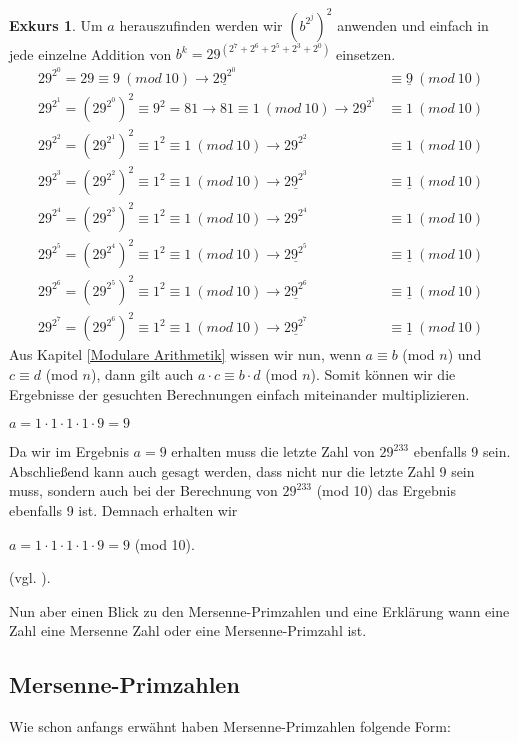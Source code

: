 \documentclass[12pt,a4paper]{article}
\theoremstyle{definition}
\newtheorem{exkurs}{Exkurs}
\begin{document}
\begin{exkurs}
Um $a$ herauszufinden werden wir $(b^{2^j})^2$ anwenden und einfach in jede einzelne Addition von $b^k = 29^{(2^7 + 2^6 + 2^5 + 2^3 + 2^0)}$ einsetzen.
\begin{align}
29^{2^0} = 29 \equiv 9\ (mod\ 10)                           \rightarrow \underline{29^{2^0}} &\equiv \underline{9}\ (mod\ 10) \\
29^{2^1} = (29^{2^0})^2 \equiv 9^2 = 81 \rightarrow 81 \equiv 1\ (mod\ 10) \rightarrow 29^{2^1} &\equiv 1\ (mod\ 10) \\
29^{2^2} = (29^{2^1})^2 \equiv 1^2 \equiv 1\ (mod\ 10) \rightarrow 29^{2^2} &\equiv 1\ (mod\ 10) \\
29^{2^3} = (29^{2^2})^2 \equiv 1^2 \equiv 1\ (mod\ 10) \rightarrow \underline{29^{2^3}} &\equiv \underline{1}\ (mod\ 10) \\
29^{2^4} = (29^{2^3})^2 \equiv 1^2 \equiv 1\ (mod\ 10) \rightarrow 29^{2^4} &\equiv 1\ (mod\ 10) \\
29^{2^5} = (29^{2^4})^2 \equiv 1^2 \equiv 1\ (mod\ 10) \rightarrow \underline{29^{2^5}} &\equiv \underline{1}\ (mod\ 10) \\
29^{2^6} = (29^{2^5})^2 \equiv 1^2 \equiv 1\ (mod\ 10) \rightarrow \underline{29^{2^6}} &\equiv \underline{1}\ (mod\ 10) \\
29^{2^7} = (29^{2^6})^2 \equiv 1^2 \equiv 1\ (mod\ 10) \rightarrow \underline{29^{2^7}} &\equiv \underline{1}\ (mod\ 10)
\end{align}
Aus Kapitel \ref{Modulare Arithmetik} wissen wir nun, wenn $a\equiv b$ (mod $n$) und $c\equiv d$ (mod $n$), dann gilt auch $a \cdot c\equiv b \cdot d$ (mod $n$).
Somit können wir die Ergebnisse der gesuchten Berechnungen einfach miteinander multiplizieren.
\begin{center}
$a = 1 \cdot 1 \cdot 1 \cdot 1 \cdot 9 = 9$
\end{center}
Da wir im Ergebnis $a = 9$ erhalten muss die letzte Zahl von $29^{233}$ ebenfalls 9 sein.
Abschließend kann auch gesagt werden, dass nicht nur die letzte Zahl 9 sein muss, sondern auch bei der Berechnung von $29^{233}$ (mod 10) das Ergebnis ebenfalls 9 ist.
Demnach erhalten wir 
\begin{center}
$a = 1 \cdot 1 \cdot 1 \cdot 1 \cdot 9 = 9$ (mod 10).
\end{center}
(vgl. \cite[122]{Arndt2000}).

Nun aber einen Blick zu den Mersenne-Primzahlen und eine Erklärung wann eine Zahl eine Mersenne Zahl oder eine Mersenne-Primzahl ist.

\subsection{Mersenne-Primzahlen}\label{Mersenne-Primzahlen}
Wie schon anfangs erwähnt haben Mersenne-Primzahlen folgende Form:


\end{exkurs}
\end{document}
